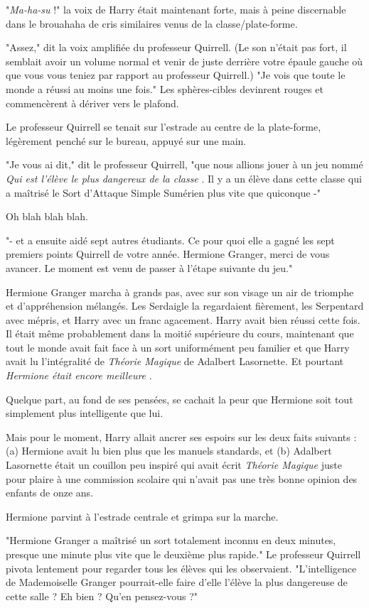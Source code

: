 "\emph{Ma-ha-su}  !" la voix de Harry était maintenant forte, mais à peine discernable dans le brouahaha de cris similaires venus de la classe/plate-forme.

"Assez," dit la voix amplifiée du professeur Quirrell. (Le son n'était pas fort, il semblait avoir un volume normal et venir de juste derrière votre épaule gauche où que vous vous teniez par rapport au professeur Quirrell.) "Je vois que toute le monde a réussi au moins une fois." Les sphères-cibles devinrent rouges et commencèrent à dériver vers le plafond.

Le professeur Quirrell se tenait sur l'estrade au centre de la plate-forme, légèrement penché sur le bureau, appuyé sur une main.

"Je vous ai dit," dit le professeur Quirrell, "que nous allions jouer à un jeu nommé \emph{Qui est l'élève le plus dangereux de la classe} . Il y a un élève dans cette classe qui a maîtrisé le Sort d'Attaque Simple Sumérien plus vite que quiconque -"

Oh blah blah blah.

"- et a ensuite aidé sept autres étudiants. Ce pour quoi elle a gagné les sept premiers points Quirrell de votre année. Hermione Granger, merci de vous avancer. Le moment est venu de passer à l'étape suivante du jeu."

Hermione Granger marcha à grands pas, avec sur son visage un air de triomphe et d'appréhension mélangés. Les Serdaigle la regardaient fièrement, les Serpentard avec mépris, et Harry avec un franc agacement. Harry avait bien réussi cette fois. Il était même probablement dans la moitié supérieure du cours, maintenant que tout le monde avait fait face à un sort uniformément peu familier et que Harry avait lu l'intégralité de \emph{Théorie Magique}  de Adalbert Lasornette. Et pourtant \emph{Hermione était encore meilleure} .

Quelque part, au fond de ses pensées, se cachait la peur que Hermione soit tout simplement plus intelligente que lui.

Mais pour le moment, Harry allait ancrer ses espoirs sur les deux faits suivants : (a) Hermione avait lu bien plus que les manuels standards, et (b) Adalbert Lasornette était un couillon peu inspiré qui avait écrit \emph{Théorie Magique}  juste pour plaire à une commission scolaire qui n'avait pas une très bonne opinion des enfants de onze ans.

Hermione parvint à l'estrade centrale et grimpa sur la marche.

"Hermione Granger a maîtrisé un sort totalement inconnu en deux minutes, presque une minute plus vite que le deuxième plus rapide." Le professeur Quirrell pivota lentement pour regarder tous les élèves qui les observaient. "L'intelligence de Mademoiselle Granger pourrait-elle faire d'elle l'élève la plus dangereuse de cette salle ? Eh bien ? Qu'en pensez-vous ?"

